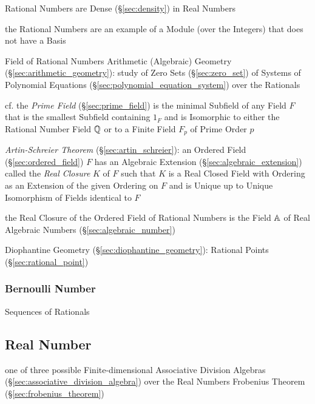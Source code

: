 Rational Numbers are Dense (\S\ref{sec:density}) in Real Numbers

the Rational Numbers are an example of a Module (over the Integers) that does
not have a Basis

Field of Rational Numbers \fist Arithmetic (Algebraic) Geometry
(\S\ref{sec:arithmetic_geometry}): study of Zero Sets (\S\ref{sec:zero_set}) of
Systems of Polynomial Equations (\S\ref{sec:polynomial_equation_system}) over
the Rationals

\fist cf. the \emph{Prime Field} (\S\ref{sec:prime_field}) is the minimal
Subfield of any Field $F$ that is the smallest Subfield containing $1_F$ and is
Isomorphic to either the Rational Number Field $\mathbb{Q}$ or to a Finite Field
$F_p$ of Prime Order $p$

\emph{Artin-Schreier Theorem} (\S\ref{sec:artin_schreier}):
an Ordered Field (\S\ref{sec:ordered_field}) $F$ has an Algebraic Extension
(\S\ref{sec:algebraic_extension}) called the \emph{Real Closure} $K$ of $F$
such that $K$ is a Real Closed Field with Ordering as an Extension of the given
Ordering on $F$ and is Unique up to Unique Isomorphism of Fields identical to
$F$

the Real Closure of the Ordered Field of Rational Numbers is the Field
$\mathbb{A}$ of Real Algebraic Numbers (\S\ref{sec:algebraic_number})

\fist Diophantine Geometry (\S\ref{sec:diophantine_geometry}): Rational Points
(\S\ref{sec:rational_point})



\subsubsection{Bernoulli Number}\label{sec:bernoulli_number}

Sequences of Rationals




\subsection{Real Number}\label{sec:real_number}

one of three possible Finite-dimensional Associative Division Algebras
(\S\ref{sec:associative_division_algebra}) over the Real Numbers \fist
Frobenius Theorem (\S\ref{sec:frobenius_theorem})

